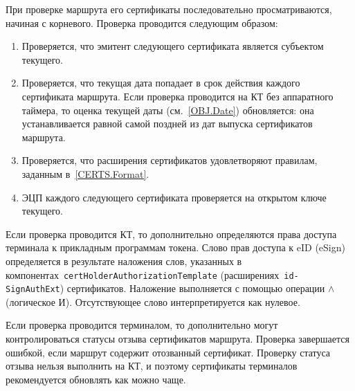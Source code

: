 При проверке маршрута его сертификаты последовательно просматриваются, начиная 
с корневого. Проверка проводится следующим образом:
\begin{enumerate}
\item
Проверяется, что эмитент следующего сертификата является субъектом текущего.

\item
Проверяется, что текущая дата попадает в срок действия каждого сертификата маршрута. 
Если проверка проводится на КТ без аппаратного таймера, то оценка текущей даты 
(см.~\ref{OBJ.Date}) обновляется: она устанавливается равной самой поздней из дат 
выпуска сертификатов маршрута.

\item
Проверяется, что расширения сертификатов удовлетворяют правилам,
заданным в~\ref{CERTS.Format}.

\item
ЭЦП каждого следующего сертификата проверяется на открытом ключе текущего.
\end{enumerate}

Если проверка проводится КТ, то дополнительно определяются права доступа
терминала к прикладным программам токена. Слово прав доступа к eID (eSign) 
определяется в результате наложения слов, указанных в
компонентах~\texttt{certHolderAuthorizationTemplate} 
(расширениях~\texttt{id-SignAuthExt}) сертификатов.
%
Наложение выполняется с помощью операции $\wedge$ (логическое И). 
Отсутствующее слово интерпретируется как нулевое.

Если проверка проводится терминалом, то дополнительно могут контролироваться
статусы отзыва сертификатов маршрута. Проверка завершается ошибкой, если 
маршрут содержит отозванный сертификат. 
%
Проверку статуса отзыва нельзя выполнить на КТ, и поэтому сертификаты 
терминалов рекомендуется обновлять как можно чаще.


